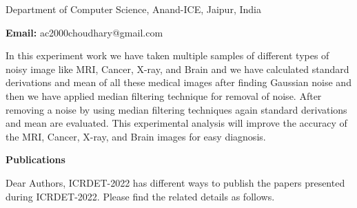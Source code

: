 \documentclass[twoside,11pt]{amsart}
\begin{document}
\vskip 5mm
\begin{flushleft}
Department of Computer Science, Anand-ICE, Jaipur, India
\vskip 5mm
\end{flushleft}
\vskip 2mm
\begin{flushleft}
{\bf Email:} ac2000choudhary@gmail.com
\end{flushleft}
\vskip 5mm
In this experiment work we have taken multiple samples of different types of noisy
image like MRI, Cancer, X-ray, and Brain and we have calculated standard
derivations and mean of all these medical images after finding Gaussian noise and
then we have applied median filtering technique for removal of noise. After
removing a noise by using median filtering techniques again standard derivations
and mean are evaluated. This experimental analysis will improve the accuracy of the
MRI, Cancer, X-ray, and Brain images for easy diagnosis.
\vskip 2mm
\newpage
\begin{center}\bf\LARGE
Publications
\end{center}
Dear Authors,
\vskip 5mm
ICRDET-2022 has different ways to publish the papers presented during ICRDET-2022. Please find the related details as follows.
\vskip 2mm
\end{document}
